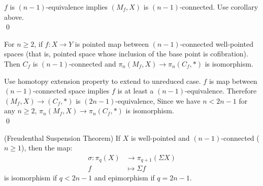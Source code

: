     \begin{prf}
        $f$ is $(n-1)$-equivalence implies $(M_f,X)$ is $(n-1)$-connected.
        Use corollary above.\\
        \qed
    \end{prf}

    \begin{cor}
        For $n\geq 2$,
        if $f : X \to Y$ is pointed map between
        $(n-1)$-connected well-pointed spaces
        (that is, pointed space whose inclusion of the base point is cofibration).
        Then $C_f$ is $(n-1)$-connected and $\pi_n(M_f,X) \to \pi_n(C_f, \ast)$
        is isomorphism.
    \end{cor}

    \begin{prf}
        Use homotopy extension property to extend to unreduced case.
        $f$ is map between $(n-1)$-connected space
        implies $f$ is at least a $(n-1)$-equivalence.
        Therefore $(M_f,X) \to (C_f,\ast)$ is $(2n-1)$-equivalence,
        Since we have $n < 2n-1$ for any $n \geq 2$,
        $\pi_n(M_f,X) \to \pi_n(C_f, \ast)$ is isomorphism.\\
        \qed
    \end{prf}

    \begin{thm}
        (Freudenthal Suspension Theorem)
        If $X$ is well-pointed and $(n-1)$-connected ($n \geq 1$),
        then the map:
        \begin{align*}
            \sigma : \pi_q(X) & \to \pi_{q+1}(\Sigma X) \\
            f & \mapsto \Sigma f
        \end{align*}
        is isomorphism if $q < 2n-1$
        and epimorphism if $q = 2n-1$.
    \end{thm}

